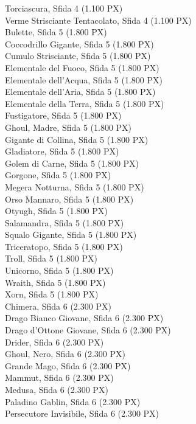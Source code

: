 \begin{multicols}{3}
{Torciascura, Sfida 4 (1.100 PX)\\
Verme Strisciante Tentacolato, Sfida 4 (1.100 PX)\\
Bulette, Sfida 5 (1.800 PX)\\
Coccodrillo Gigante, Sfida 5 (1.800 PX)\\
Cumulo Strisciante, Sfida 5 (1.800 PX)\\
Elementale del Fuoco, Sfida 5 (1.800 PX)\\
Elementale dell'Acqua, Sfida 5 (1.800 PX)\\
Elementale dell'Aria, Sfida 5 (1.800 PX)\\
Elementale della Terra, Sfida 5 (1.800 PX)\\
Fustigatore, Sfida 5 (1.800 PX)\\
Ghoul, Madre, Sfida 5 (1.800 PX)\\
Gigante di Collina, Sfida 5 (1.800 PX)\\
Gladiatore, Sfida 5 (1.800 PX)\\
Golem di Carne, Sfida 5 (1.800 PX)\\
Gorgone, Sfida 5 (1.800 PX)\\
Megera Notturna, Sfida 5 (1.800 PX)\\
Orso Mannaro, Sfida 5 (1.800 PX)\\
Otyugh, Sfida 5 (1.800 PX)\\
Salamandra, Sfida 5 (1.800 PX)\\
Squalo Gigante, Sfida 5 (1.800 PX)\\
Triceratopo, Sfida 5 (1.800 PX)\\
Troll, Sfida 5 (1.800 PX)\\
Unicorno, Sfida 5 (1.800 PX)\\
Wraith, Sfida 5 (1.800 PX)\\
Xorn, Sfida 5 (1.800 PX)\\
Chimera, Sfida 6 (2.300 PX)\\
Drago Bianco Giovane, Sfida 6 (2.300 PX)\\
Drago d'Ottone Giovane, Sfida 6 (2.300 PX)\\
Drider, Sfida 6 (2.300 PX)\\
Ghoul, Nero, Sfida 6 (2.300 PX)\\
Grande Mago, Sfida 6 (2.300 PX)\\
Mammut, Sfida 6 (2.300 PX)\\
Medusa, Sfida 6 (2.300 PX)\\
Paladino Gablin, Sfida 6 (2.300 PX)\\
Persecutore Invisibile, Sfida 6 (2.300 PX)\\
}
\end{multicols}
